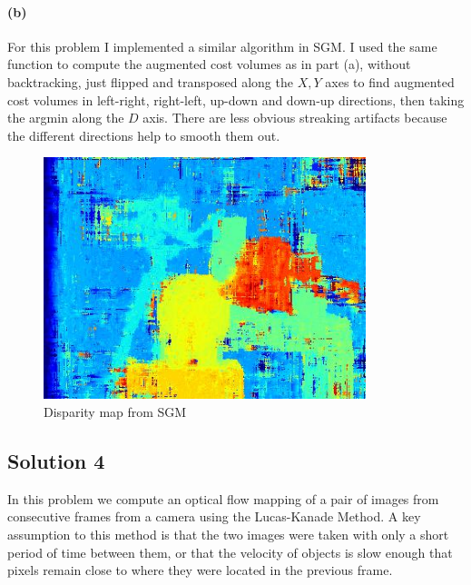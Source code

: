 \documentclass{article}
\newcommand{\solution}[1]{\clearpage \subsection*{Solution #1}}
\newcommand{\spart}[1]{\paragraph{(#1)}}
\begin{document}
\spart{b} For this problem I implemented a similar algorithm in SGM. I used the same function to compute the augmented cost volumes as in part (a), without backtracking, just flipped and transposed along the $X,Y$ axes to find augmented cost volumes in left-right, right-left, up-down and down-up directions, then taking the argmin along the $D$ axis. There are less obvious streaking artifacts because the different directions help to smooth them out.

\begin{figure}[!h]
	\centering
	\includegraphics[height=19em]{prob3b}
	\caption{Disparity map from SGM}
	\label{fig:p3b}
\end{figure}

\solution{4}

In this problem we compute an optical flow mapping of a pair of images from consecutive frames from a camera using the Lucas-Kanade Method. A key assumption to this method is that the two images were taken with only a short period of time between them, or that the velocity of objects is slow enough that pixels remain close to where they were located in the previous frame.
\end{document}
